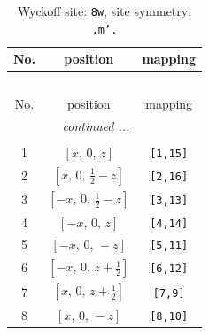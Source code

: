 \documentclass[fleqn,8pt]{jsarticle}
\begin{document}
\begin{longtable}{ccc}
\caption{Wyckoff site: {\tt 8w}, site symmetry: {\tt .m'.}}
 \\
 \hline \hline
No. & position & mapping \\ \hline \endfirsthead

\multicolumn{2}{l}{\tablename\ \thetable{}} \\
 \hline \hline
No. & position & mapping \\ \hline \endhead

 \hline \hline
\multicolumn{2}{r}{\footnotesize\it continued ...} \\ \endfoot

 \hline \hline
\multicolumn{2}{r}{} \\ \endlastfoot

1 & $\left[ x,\, 0,\, z \right]$ & {\tt [1,15]} \\ \hline
2 & $\left[ x,\, 0,\, \frac{1}{2} - z \right]$ & {\tt [2,16]} \\ \hline
3 & $\left[ - x,\, 0,\, \frac{1}{2} - z \right]$ & {\tt [3,13]} \\ \hline
4 & $\left[ - x,\, 0,\, z \right]$ & {\tt [4,14]} \\ \hline
5 & $\left[ - x,\, 0,\, - z \right]$ & {\tt [5,11]} \\ \hline
6 & $\left[ - x,\, 0,\, z + \frac{1}{2} \right]$ & {\tt [6,12]} \\ \hline
7 & $\left[ x,\, 0,\, z + \frac{1}{2} \right]$ & {\tt [7,9]} \\ \hline
8 & $\left[ x,\, 0,\, - z \right]$ & {\tt [8,10]} \\
\end{longtable}
\renewcommand{\arraystretch}{1.2}
\end{document}
